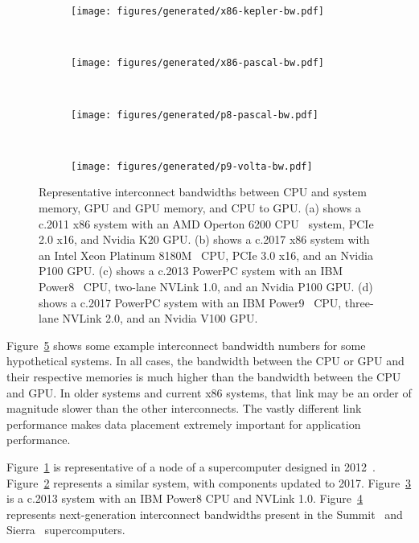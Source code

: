 \begin{figure}[ht]
    \centering
    \begin{subfigure}[b]{0.2\textwidth}
        \texttt{[image: figures/generated/x86-kepler-bw.pdf]}
        \caption{}
        \label{fig:x86-kepler-bw}
    \end{subfigure}
	~
	\begin{subfigure}[b]{0.2\textwidth}
        \texttt{[image: figures/generated/x86-pascal-bw.pdf]}
        \caption{}
        \label{fig:x86-pascal-bw}
    \end{subfigure}
    ~
    \begin{subfigure}[b]{0.2\textwidth}
        \texttt{[image: figures/generated/p8-pascal-bw.pdf]}
        \caption{}
        \label{fig:p8-pascal-bw}
    \end{subfigure}
    ~
    \begin{subfigure}[b]{0.2\textwidth}
        \texttt{[image: figures/generated/p9-volta-bw.pdf]}
        \caption{}
        \label{fig:p9-volta-bw}
    \end{subfigure}
	\caption[Example System Interconnect Bandwidths]{
		Representative interconnect bandwidths between CPU and system memory, GPU and GPU memory, and CPU to GPU.
		(a) shows a c.2011 x86 system with an AMD Operton 6200 CPU~\cite{amd2012opteron6200} system, PCIe 2.0 x16, and Nvidia K20 GPU.
		(b) shows a c.2017 x86 system with an Intel Xeon Platinum 8180M~\cite{intel20188180m} CPU, PCIe 3.0 x16, and an Nvidia P100 GPU.
		(c) shows a c.2013 PowerPC system with an IBM Power8~\cite{stuechli2013power8} CPU, two-lane NVLink 1.0, and an Nvidia P100 GPU.
		(d) shows a c.2017 PowerPC system with an IBM Power9~\cite{thompto2016power9} CPU, three-lane NVLink 2.0, and an Nvidia V100 GPU.
	}
    \label{fig:gpu-sys-arch}
\end{figure}

Figure~\ref{fig:gpu-sys-arch} shows some example interconnect bandwidth numbers for some hypothetical systems.
In all cases, the bandwidth between the CPU or GPU and their respective memories is much higher than the bandwidth between the CPU and GPU.
In older systems and current x86 systems, that link may be an order of magnitude slower than the other interconnects.
The vastly different link performance makes data placement extremely important for application performance.

Figure~\ref{fig:x86-kepler-bw} is representative of a node of a supercomputer designed in 2012~\cite{ncsa2018bluewaters}.
Figure~\ref{fig:x86-pascal-bw} represents a similar system, with components updated to 2017.
Figure~\ref{fig:p8-pascal-bw} is a c.2013 system with an IBM Power8 CPU and NVLink 1.0.
Figure~\ref{fig:p9-volta-bw} represents next-generation interconnect bandwidths present in the Summit~\cite{ornl2018summit} and Sierra~\cite{llnl2018sierra} supercomputers.

